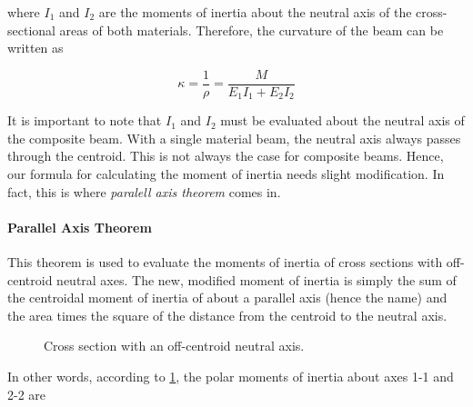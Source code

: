 \documentclass[
10pt,
a4paper,
openany,
svgnames,
]{kaobook} %
\begin{document}
where $I_1$ and $I_2$ are the moments of inertia about the neutral axis of the cross-sectional areas of both materials. Therefore, the curvature of the beam can be written as

\begin{equation}
  \kappa  = \frac{1}{\rho } = \frac{M}{E_1I_1 + E_2I_2}
\end{equation}

It is important to note that $I_1$ and $I_2$ must be evaluated about the neutral axis of the composite beam. With a single material beam, the neutral axis always passes through the centroid. This is not always the case for composite beams. Hence, our formula for calculating the moment of inertia needs slight modification. In fact, this is where \emph{paralell axis theorem} comes in.

\paragraph{Parallel Axis Theorem}

This theorem is used to evaluate the moments of inertia of cross sections with off-centroid neutral axes. The new, modified moment of inertia is simply the sum of the centroidal moment of inertia of about a parallel axis (hence the name) and the area times the square of the distance from the centroid to the neutral axis.

\begin{figure}[h]
  \centering
  \caption{Cross section with an off-centroid neutral axis.}
  \label{fig: parallel axis theorem}
\end{figure}

In other words, according to \cref{fig: parallel axis theorem}, the polar moments of inertia about axes 1-1 and 2-2 are
\end{document}
